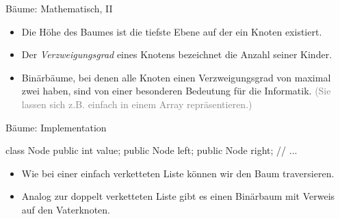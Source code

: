 \begin{frame}{Bäume: Mathematisch, II}
    \begin{itemize}[<+(1)->]
        \widei
        \item Die Höhe des Baumes ist die tiefste Ebene auf der ein Knoten existiert.
        \item Der \textit{Verzweigungsgrad} eines Knotens bezeichnet die Anzahl seiner Kinder.
        \item Binärbäume, bei denen alle Knoten einen Verzweigungsgrad von maximal zwei haben,\pause{} sind von einer besonderen Bedeutung für die Informatik.\pause{} \textcolor{gray}{(Sie lassen sich z.B. einfach in einem Array repräsentieren.)}
    \end{itemize}
\end{frame}

\begin{frame}[fragile]{Bäume: Implementation}
    \pause{}
    \begin{minipage}{0.4\linewidth}
\small%
\begin{plainjava}
class Node {
    public int value;
    public Node left;
    public Node right;
    // ...
}
\end{plainjava}
    \end{minipage}\hfill{}\pause{}\begin{minipage}{0.55\linewidth}%
\centering{}
\end{minipage}\vfill
    \begin{itemize}[<+(1)->]
        \widei
        \item Wie bei einer einfach verketteten Liste können wir den Baum traversieren.
        \item Analog zur doppelt verketteten Liste gibt es einen Binärbaum mit Verweis auf den Vaterknoten.
    \end{itemize}
\end{frame}


